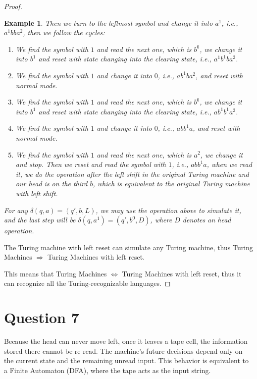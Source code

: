 \documentclass[a4paper, UTF-8]{article}
\theoremstyle{plain}
\newtheorem{example}{\indent Example}[section]
\begin{document}
\begin{proof}
\begin{example}
Then we turn to the leftmost symbol and change it into $a^1$, i.e., $a^1bba^2$, then we follow the cycles:
\begin{enumerate}
    \item We find the symbol with $1$ and read the next one, which is $b^0$, we change it into $b^1$ and reset with state changing into the clearing state, i.e., $a^1b^1ba^2$.
    \item We find the symbol with $1$ and change it into $0$, i.e., $ab^1ba^2$, and reset with normal mode.
    \item We find the symbol with $1$ and read the next one, which is $b^0$, we change it into $b^1$ and reset with state changing into the clearing state, i.e., $ab^1b^1a^2$.
    \item We find the symbol with $1$ and change it into $0$, i.e., $abb^1a$, and reset with normal mode.
    \item We find the symbol with $1$ and read the next one, which is $a^2$, we change it and stop. Then we reset and read the symbol with $1$, i.e., $abb^1a$, when we read it, we do the operation after the left shift in the original Turing machine and our head is on the third $b$, which is equivalent to the original Turing machine with left shift.
\end{enumerate}

For any $\delta(q, a) = (q', b, L)$, we may use the operation above to simulate it, and the last step will be $\delta(q, a^1) = (q', b^0, D)$, where $D$ denotes an head operation. 

\end{example}

The Turing machine with left reset can simulate any Turing machine, thus Turing Machines $\Rightarrow$ Turing Machines with left reset.

This means that Turing Machines $\Leftrightarrow$ Turing Machines with left reset, thus it can recognize all the Turing-recognizable languages.

\end{proof}

\section{Question 7} 

Because the head can never move left, once it leaves a tape cell, the information stored there cannot be re-read. The machine's future decisions depend only on the current state and the remaining unread input. This behavior is equivalent to a Finite Automaton (DFA), where the tape acts as the input string.
\end{document}
